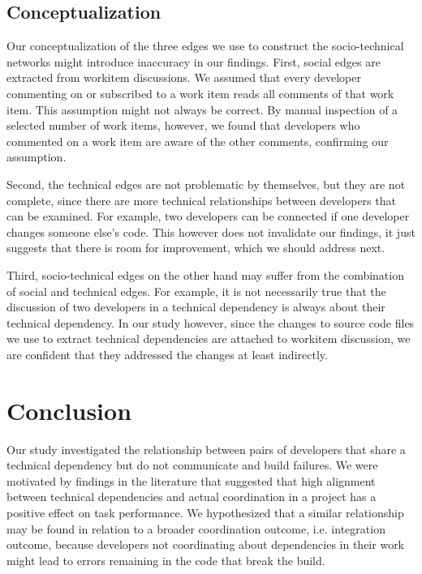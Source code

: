 \documentclass[12pt,oneside]{book}
\begin{document}
\subsection{Conceptualization}
Our conceptualization of the three edges we use to construct the
socio-technical networks might introduce inaccuracy in our findings.
First, social edges are extracted from workitem discussions. We assumed that
every developer commenting on or subscribed to a work item reads all comments of that
work item. This assumption might not always be correct. By manual inspection of
a selected number of work items, however, we found that developers who
commented on a work item are aware of the other comments, confirming our assumption.

Second, the technical edges are not problematic by themselves, but they are not
complete, since there are more technical relationships between developers that
can be examined. For example, two developers can be connected if one developer
changes someone else's code. This however does not invalidate our findings, it
just suggests that there is room for improvement, which we should address
next.

Third, socio-technical edges on the other hand may suffer from the combination of
social and technical edges. For example, it is not necessarily true that the
discussion of  two developers in a technical dependency is always about their
technical dependency. 
In our study however, since the changes to
source code files we use to extract technical dependencies are attached to workitem discussion, we are
confident that they addressed the changes at least indirectly.



\section{Conclusion}
\label{sec:conclusions}
Our study investigated the relationship between pairs of developers that share
a technical dependency but do not communicate and build failures. We were
motivated by findings in the literature that suggested that high alignment between technical dependencies and actual coordination in a project has a positive effect on task
performance.
%
We hypothesized that a similar relationship may be found in relation to a broader
coordination outcome, i.e. integration outcome, because developers not
coordinating about dependencies in their work might lead to errors remaining in
the code that break the build.
\end{document}
